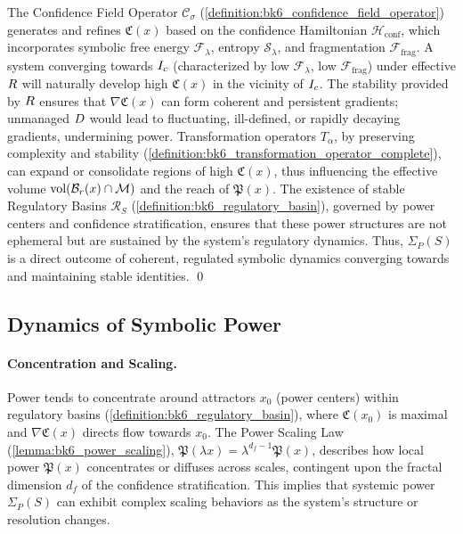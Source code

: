 \begin{demonstratio}
\label{demonstratio:bk7_operator_basis_systemic_power}
The Confidence Field Operator \(\mathcal{C}_\sigma\) (\ref{definition:bk6_confidence_field_operator}) generates and refines \(\mathfrak{C}(x)\) based on the confidence Hamiltonian \(\mathcal{H}_{\text{conf}}\), which incorporates symbolic free energy \(\mathcal{F}_\lambda\), entropy \(\mathcal{S}_\lambda\), and fragmentation \(\mathcal{F}_{\text{frag}}\). A system converging towards \(I_c\) (characterized by low \(\mathcal{F}_\lambda\), low \(\mathcal{F}_{\text{frag}}\)) under effective \(R\) will naturally develop high \(\mathfrak{C}(x)\) in the vicinity of \(I_c\).
The stability provided by \(R\) ensures that \(\nabla \mathfrak{C}(x)\) can form coherent and persistent gradients; unmanaged \(D\) would lead to fluctuating, ill-defined, or rapidly decaying gradients, undermining power.
Transformation operators \(T_\alpha\), by preserving complexity and stability (\ref{definition:bk6_transformation_operator_complete}), can expand or consolidate regions of high \(\mathfrak{C}(x)\), thus influencing the effective volume \(\text{vol}(\mathcal{B}_r(x) \cap \mathcal{M})\) and the reach of \(\mathfrak{P}(x)\).
The existence of stable Regulatory Basins \(\mathcal{R}_S\) (\ref{definition:bk6_regulatory_basin}), governed by power centers and confidence stratification, ensures that these power structures are not ephemeral but are sustained by the system's regulatory dynamics. Thus, \(\Sigma_P(S)\) is a direct outcome of coherent, regulated symbolic dynamics converging towards and maintaining stable identities. \qed
\end{demonstratio}

\subsection{Dynamics of Symbolic Power}
\label{subsec:bk7_dynamics_symbolic_power}

\paragraph{Concentration and Scaling.} Power tends to concentrate around attractors \(x_0\) (power centers) within regulatory basins (\ref{definition:bk6_regulatory_basin}), where \(\mathfrak{C}(x_0)\) is maximal and \(\nabla \mathfrak{C}(x)\) directs flow towards \(x_0\). The Power Scaling Law (\ref{lemma:bk6_power_scaling}), \(\mathfrak{P}(\lambda x) = \lambda^{d_f - 1} \mathfrak{P}(x)\), describes how local power \(\mathfrak{P}(x)\) concentrates or diffuses across scales, contingent upon the fractal dimension \(d_f\) of the confidence stratification. This implies that systemic power \(\Sigma_P(S)\) can exhibit complex scaling behaviors as the system's structure or resolution changes.


